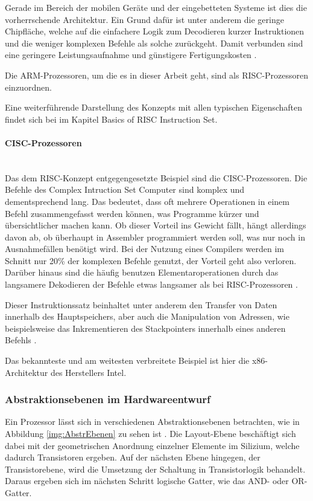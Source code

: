 \documentclass[11pt,a4paper,titlepage]{article}
\begin{document}
Gerade im Bereich der mobilen Geräte und der eingebetteten Systeme ist dies die vorherrschende Architektur. Ein Grund dafür ist unter anderem die geringe Chipfläche, welche auf die einfachere Logik zum Decodieren kurzer Instruktionen und die weniger komplexen Befehle als solche zurückgeht. Damit verbunden sind eine geringere Leistungsaufnahme und günstigere Fertigungskosten \cite[S. 384]{Hoffmann}.

Die ARM-Prozessoren, um die es in dieser Arbeit geht, sind als RISC-Prozessoren einzuordnen.

Eine weiterführende Darstellung des Konzepts mit allen typischen Eigenschaften findet sich bei \cite[S. C-4]{Hennessy} im Kapitel Basics of RISC Instruction Set.

\paragraph{CISC-Prozessoren}$\;$\\

Das dem RISC-Konzept entgegengesetzte Beispiel sind die CISC-Prozessoren.
Die Befehle des Complex Intruction Set Computer sind komplex und dementsprechend lang. Das bedeutet, dass oft mehrere Operationen in einem Befehl zusammengefasst werden können, was Programme kürzer und übersichtlicher machen kann. Ob dieser Vorteil ins Gewicht fällt, hängt allerdings davon ab, ob überhaupt in Assembler programmiert werden soll, was nur noch in Ausnahmefällen benötigt wird. Bei der Nutzung eines Compilers werden im Schnitt nur 20\% der komplexen Befehle genutzt, der Vorteil geht also verloren. Darüber hinaus sind die häufig benutzen Elementaroperationen durch das langsamere Dekodieren der Befehle etwas langsamer als bei RISC-Prozessoren \cite[S. 384]{Hoffmann}.

Dieser Instruktionssatz beinhaltet unter anderem den Transfer von Daten innerhalb des Hauptspeichers, aber auch die Manipulation von Adressen, wie beispielsweise das Inkrementieren des Stackpointers innerhalb eines anderen Befehls \cite[S. 380]{Hoffmann}.

Das bekannteste und am weitesten verbreitete Beispiel ist hier die x86-Architektur des Herstellers Intel.

\subsubsection{Abstraktionsebenen im Hardwareentwurf}

Ein Prozessor lässt sich in verschiedenen Abstraktionsebenen betrachten, wie in Abbildung \ref{img:AbstrEbenen} zu sehen ist \cite[S. 19]{Golze}. Die Layout-Ebene beschäftigt sich dabei mit der geometrischen Anordnung einzelner Elemente im Silizium, welche dadurch Transistoren ergeben. Auf der nächsten Ebene hingegen, der Transistorebene, wird die Umsetzung der Schaltung in Transistorlogik behandelt. Daraus ergeben sich im nächsten Schritt logische Gatter, wie das AND- oder OR-Gatter.
\end{document}
